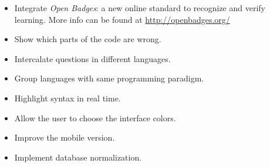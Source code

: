\begin{itemize}
\item Integrate \textit{Open Badges}: a new online standard to recognize and verify learning. More info can be found at \url{http://openbadges.org/}

\item Show which parts of the code are wrong.

\item Intercalate questions in different languages.

\item Group languages with same programming paradigm.

\item Highlight syntax in real time.

\item Allow the user to choose the interface colors.

\item Improve the mobile version.

\item Implement database normalization.

\end{itemize}